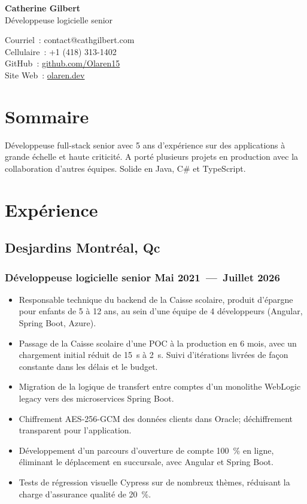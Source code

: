 \documentclass[10pt]{article} %
\begin{document}
\begin{center}
	\begin{minipage}[c]{0.56\textwidth}
		\raggedright
		{\Huge\bfseries Catherine Gilbert} \\[2pt]
		Développeuse logicielle senior
	\end{minipage} \hfill
	\begin{minipage}[c]{0.42\textwidth}
		\raggedleft
		\small
		Courriel~: contact@cathgilbert.com \\
		Cellulaire~: +1 (418) 313-1402 \\
		GitHub~: \href{https://github.com/Olaren15}{github.com/Olaren15} \\
		Site Web~: \href{https://olaren.dev}{olaren.dev}
	\end{minipage}
\end{center}


\section{Sommaire}
Développeuse full-stack senior avec 5 ans d'expérience sur des applications à
grande échelle et haute criticité. A porté plusieurs projets en production avec
la collaboration d'autres équipes. Solide en Java, C\# et TypeScript.


\section{Expérience}
\subsection{Desjardins \hfill Montréal, Qc}
\subsubsection{Développeuse logicielle senior \hfill Mai 2021~---~Juillet 2026}
\begin{itemize}
    \item Responsable technique du backend de la Caisse scolaire, produit
        d'épargne pour enfants de 5 à 12 ans, au sein d'une équipe de 4
        développeurs (Angular, Spring Boot, Azure).
    \item Passage de la Caisse scolaire d'une POC à la production en 6 mois, avec
        un chargement initial réduit de 15~s à 2~s. Suivi d'itérations livrées de
        façon constante dans les délais et le budget.
    \item Migration de la logique de transfert entre comptes d'un monolithe
        WebLogic legacy vers des microservices Spring Boot.
    \item Chiffrement AES-256-GCM des données clients dans Oracle;
        déchiffrement transparent pour l'application.
    \item Développement d'un parcours d'ouverture de compte 100~\% en ligne,
        éliminant le déplacement en succursale, avec Angular et Spring Boot.
    \item Tests de régression visuelle Cypress sur de nombreux thèmes,
        réduisant la charge d'assurance qualité de 20~\%.
\end{itemize}
\end{document}
